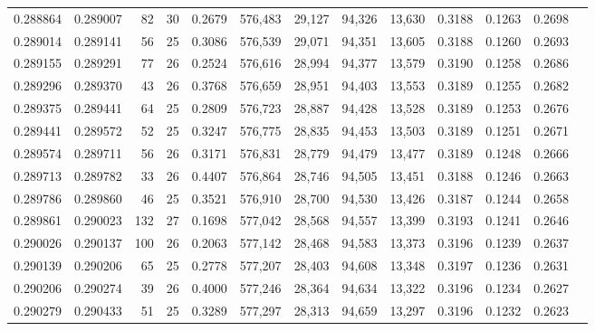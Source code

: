 \begin{tabular}{rrrrrrrrrrrrr}
0.288864 & 0.289007 &  82 &  30 &                                     0.2679 & 576,483 &  29,127 &  94,326 &  13,630 & 0.3188 & 0.1263 & 0.2698 \\
0.289014 & 0.289141 &  56 &  25 &                                     0.3086 & 576,539 &  29,071 &  94,351 &  13,605 & 0.3188 & 0.1260 & 0.2693 \\
0.289155 & 0.289291 &  77 &  26 &                                     0.2524 & 576,616 &  28,994 &  94,377 &  13,579 & 0.3190 & 0.1258 & 0.2686 \\
0.289296 & 0.289370 &  43 &  26 &                                     0.3768 & 576,659 &  28,951 &  94,403 &  13,553 & 0.3189 & 0.1255 & 0.2682 \\
0.289375 & 0.289441 &  64 &  25 &                                     0.2809 & 576,723 &  28,887 &  94,428 &  13,528 & 0.3189 & 0.1253 & 0.2676 \\
0.289441 & 0.289572 &  52 &  25 &                                     0.3247 & 576,775 &  28,835 &  94,453 &  13,503 & 0.3189 & 0.1251 & 0.2671 \\
0.289574 & 0.289711 &  56 &  26 &                                     0.3171 & 576,831 &  28,779 &  94,479 &  13,477 & 0.3189 & 0.1248 & 0.2666 \\
0.289713 & 0.289782 &  33 &  26 &                                     0.4407 & 576,864 &  28,746 &  94,505 &  13,451 & 0.3188 & 0.1246 & 0.2663 \\
0.289786 & 0.289860 &  46 &  25 &                                     0.3521 & 576,910 &  28,700 &  94,530 &  13,426 & 0.3187 & 0.1244 & 0.2658 \\
0.289861 & 0.290023 & 132 &  27 &                                     0.1698 & 577,042 &  28,568 &  94,557 &  13,399 & 0.3193 & 0.1241 & 0.2646 \\
0.290026 & 0.290137 & 100 &  26 &                                     0.2063 & 577,142 &  28,468 &  94,583 &  13,373 & 0.3196 & 0.1239 & 0.2637 \\
0.290139 & 0.290206 &  65 &  25 &                                     0.2778 & 577,207 &  28,403 &  94,608 &  13,348 & 0.3197 & 0.1236 & 0.2631 \\
0.290206 & 0.290274 &  39 &  26 &                                     0.4000 & 577,246 &  28,364 &  94,634 &  13,322 & 0.3196 & 0.1234 & 0.2627 \\
0.290279 & 0.290433 &  51 &  25 &                                     0.3289 & 577,297 &  28,313 &  94,659 &  13,297 & 0.3196 & 0.1232 & 0.2623 \\

\end{tabular}
